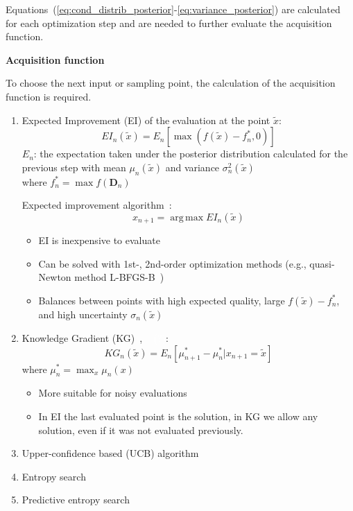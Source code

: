 \documentclass{article}
\newcommand{\todo}[1]{\colorbox{WildStrawberry}{\textcolor{white}{#1}}}
\DeclareMathOperator*{\argmax}{arg\,max}
\begin{document}
Equations~(\ref{eq:cond_distrib_posterior}-\ref{eq:variance_posterior}) are calculated for each optimization step and are needed to further evaluate the acquisition function.

\textbf{Acquisition function}

To choose the next input or sampling point, the calculation of the acquisition function is required.
\begin{enumerate}
    \item
        Expected Improvement (EI) of the evaluation at the point $\tilde x$:
        \begin{equation*}
            EI_n (\tilde x) = E_n [\max(f(\tilde x)-f^*_n, 0)]
        \end{equation*}
        $E_n$: the expectation taken under the posterior distribution calculated for the previous step with mean $\mu_n(\tilde x)$ and variance $\sigma^2_n (\tilde x)$\\
        where $f^*_n = \max f({\mathbf{D}_n})$
    
        Expected improvement algorithm~\cite{movckus1975bayesian, Jones1998}:
        \begin{equation*}
            x_{n+1} = \argmax EI_n (\tilde x)
        \end{equation*}
    
        \begin{itemize}
            \item EI is inexpensive to evaluate
            \item Can be solved with 1st-, 2nd-order optimization methods (e.g., quasi-Newton method L-BFGS-B~\cite{liu1989limited})
            \item Balances between points with high expected quality, large $f(\tilde x)-f^*_n$, and high uncertainty $\sigma_n(\tilde x)$
        \end{itemize}
    \item
        Knowledge Gradient (KG)~\cite{frazier2008knowledge, frazier2009knowledge}, \todo{~\cite{chick2001new} (?)}:
          \begin{equation*}
              KG_n(\tilde x) = E_n [\mu^*_{n+1} - \mu^*_{n}|x_{n+1}=\tilde x]
          \end{equation*}
          where $\mu^*_{n} = \max_{x} \mu_n (x)$
    
          \begin{itemize}
              \item More suitable for noisy evaluations
              \item In EI the last evaluated point is the solution, in KG we allow any solution, even if it was not evaluated previously.
          \end{itemize}
    \item Upper-confidence based (UCB) algorithm~\cite{Srinivas_2012}
    \item Entropy search~\cite{hennig2012entropy}
    \item Predictive entropy search~\cite{hernandez2014predictive}
\end{enumerate}
\end{document}
